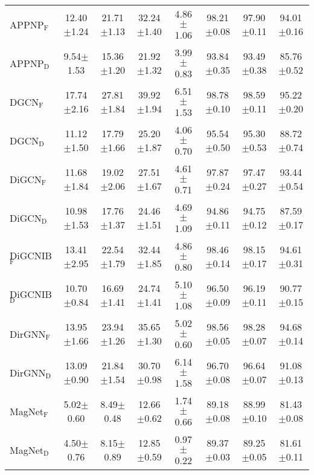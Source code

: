 \begin{table}[ht]
{\begin{tabular}{lccccccc}
        APPNP$_{\text{F}}$ & 12.40$\pm$1.24 & 21.71$\pm$1.13 & 32.24$\pm$1.40 & 4.86$\pm$1.06 & 98.21$\pm$0.08 & 97.90$\pm$0.11 & 94.01$\pm$0.16 \\ 
        APPNP$_{\text{D}}$ & 9.54$\pm$1.53 & 15.36$\pm$1.20 & 21.92$\pm$1.32 & 3.99$\pm$0.83 & 93.84$\pm$0.35 & 93.49$\pm$0.38 & 85.76$\pm$0.52 \\\midrule

        
        DGCN$_{\text{F}}$ & 17.74$\pm$2.16 & 27.81$\pm$1.84 & 39.92$\pm$1.94 & 6.51$\pm$1.53 & 98.78$\pm$0.10 & 98.59$\pm$0.11 & 95.22$\pm$0.20 \\
        DGCN$_{\text{D}}$ & 11.12$\pm$1.50 & 17.79$\pm$1.66 & 25.20$\pm$1.87 & 4.06$\pm$0.70 & 95.54$\pm$0.50 & 95.30$\pm$0.53 & 88.72$\pm$0.74 \\ \midrule

        
        DiGCN$_{\text{F}}$ & 11.68$\pm$1.84 & 19.02$\pm$2.06 & 27.51$\pm$1.67 & 4.61$\pm$0.71 & 97.87$\pm$0.24 & 97.47$\pm$0.27 & 93.44$\pm$0.54 \\
        DiGCN$_{\text{D}}$ & 10.98$\pm$1.53 & 17.76$\pm$1.37 & 24.46$\pm$1.51 & 4.69$\pm$1.09 & 94.86$\pm$0.11 & 94.75$\pm$0.12 & 87.59$\pm$0.17 \\ \midrule
        
        DiGCNIB$_{\text{F}}$ & 13.41$\pm$2.95 & 22.54$\pm$1.79 & 32.44$\pm$1.85 & 4.86$\pm$0.80 & 98.46$\pm$0.14 & 98.15$\pm$0.17 & 94.61$\pm$0.31 \\
        DiGCNIB$_{\text{D}}$ & 10.70$\pm$0.84 & 16.69$\pm$1.41 & 24.74$\pm$1.41 & 5.10$\pm$1.08 & 96.50$\pm$0.09 & 96.19$\pm$0.11 & 90.77$\pm$0.15  \\ \midrule
        
        DirGNN$_{\text{F}}$ & 13.95$\pm$1.66 & 23.94$\pm$1.26 & 35.65$\pm$1.30 & 5.02$\pm$0.60 & 98.56$\pm$0.05 & 98.28$\pm$0.07 & 94.68$\pm$0.14 \\
        DirGNN$_{\text{D}}$ & 13.09$\pm$0.90 & 21.84$\pm$1.54 & 30.70$\pm$0.98 & 6.14$\pm$1.58 & 96.70$\pm$0.08 & 96.64$\pm$0.07 & 91.08$\pm$0.13  \\
        \midrule
        
        MagNet$_{\text{F}}$ & 5.02$\pm$0.60 & 8.49$\pm$0.48 & 12.66$\pm$0.62 & 1.74$\pm$0.66 & 89.18$\pm$0.08 & 88.99$\pm$0.10 & 81.43$\pm$0.08 \\
        MagNet$_{\text{D}}$ & 4.50$\pm$0.76 & 8.15$\pm$0.89 & 12.85$\pm$0.59 & 0.97$\pm$0.22 & 89.37$\pm$0.03 & 89.25$\pm$0.05 & 81.61$\pm$0.11 \\ \midrule


\end{tabular}}
\end{table}
